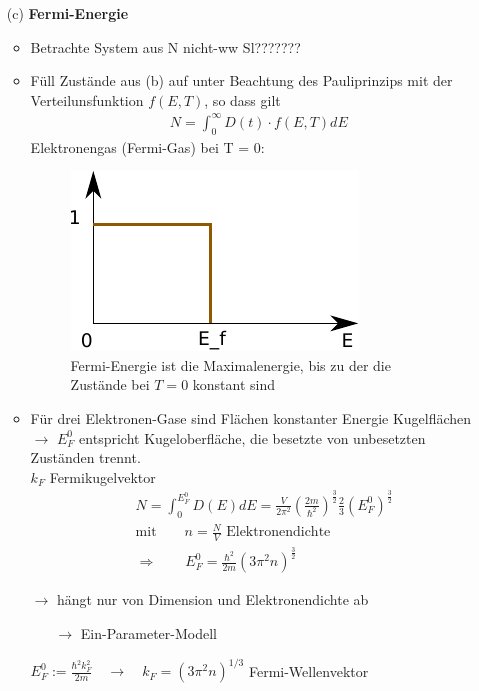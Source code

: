 \begin{itemize}
    \item[(c)] \textbf{Fermi-Energie}
    \begin{itemize}
        \item Betrachte System aus N nicht-ww Sl???????
        \item Füll Zustände aus (b) auf unter Beachtung des Pauliprinzips mit der Verteilunsfunktion $f(E,T)$, so dass gilt
        \begin{align}
            N = \int_0^\infty D(t) \cdot f(E,T) dE
            \label{eq:5_1_1}
        \end{align}
        Elektronengas (Fermi-Gas) bei T = 0:
        \begin{figure}[H]
            \centering
            \includegraphics[]{figures/5_1Fermi.pdf}
            \caption{Fermi-Energie ist die Maximalenergie, bis zu der die Zustände bei $T=0$ konstant sind}
            \label{}
        \end{figure}
        \item Für drei Elektronen-Gase sind Flächen konstanter Energie Kugelflächen $\rightarrow$ $E_F^0$ entspricht Kugeloberfläche, die besetzte von unbesetzten Zuständen trennt.\\
         $k_F$ Fermikugelvektor
         \begin{align*}
             &N = \int_0^{E_F^0} D(E)dE = \frac{V}{2\pi^2} (\frac{2m}{\hbar^2})^\frac{3}{2}\frac{2}{3}(E_F^0)^\frac{3}{2}\\
             &\text{mit} \qquad n=\frac{N}{V} \text{ Elektronendichte}\\
            &\Rightarrow \qquad E_{F}^0 = \frac{\hbar^2}{2m} (3 \pi^2 n)^\frac{3}{2}
         \end{align*}
         \item[$\rightarrow$] hängt nur von Dimension und Elektronendichte ab
         \begin{itemize}
             \item[$\rightarrow$] Ein-Parameter-Modell
         \end{itemize} 
         $E_{F}^0 := \frac{\hbar^2 k_F^2}{2 m} \quad \rightarrow \quad k_F = ( 3 \pi^2 n )^{1/3}$ Fermi-Wellenvektor

\end{itemize}
\end{itemize}

